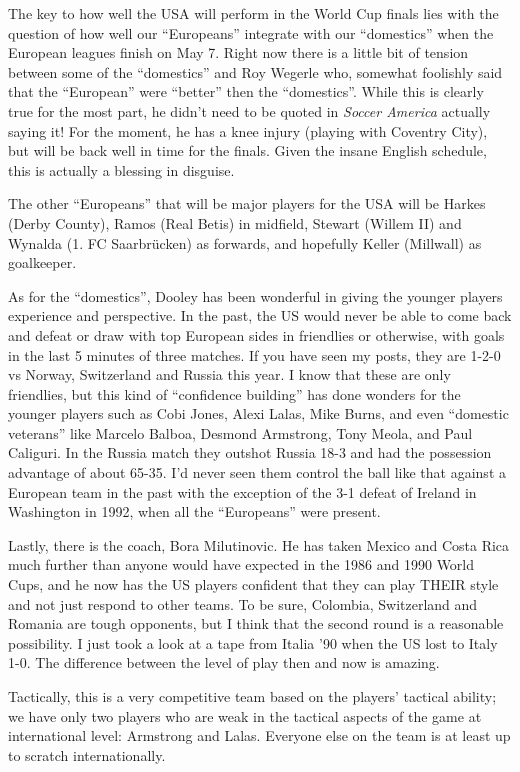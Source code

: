 The key to how well the USA will perform in the World Cup finals lies with the
question of how well our ``Europeans'' integrate with our ``domestics'' when the 
European leagues finish on May 7. Right now there is a little bit of tension 
between some of the ``domestics'' and Roy Wegerle who, somewhat foolishly said 
that the ``European'' were ``better'' then the ``domestics''. While this is clearly
true for the most part, he didn't need to be quoted in \textit{Soccer America} 
actually saying it! For the moment, he has a knee injury (playing with Coventry
City), but will be back well in time for the finals. Given the insane English
schedule, this is actually a blessing in disguise.

The other ``Europeans'' that will be major players for the USA will be Harkes 
(Derby County), Ramos (Real Betis) in midfield, Stewart (Willem II) and Wynalda
(1. FC Saarbr{\"u}cken) as forwards, and hopefully Keller (Millwall) as 
goalkeeper.

As for the ``domestics'', Dooley has been wonderful in giving the younger players
experience and perspective. In the past, the US would never be able to come 
back and defeat or draw with top European sides in friendlies or otherwise,
with goals in the last 5 minutes of three matches. If you have seen my posts, 
they are 1-2-0 vs Norway, Switzerland and Russia this year. I know that these 
are only friendlies, but this kind of ``confidence building'' has done wonders
for the younger players such as Cobi Jones, Alexi Lalas, Mike Burns, and even 
``domestic veterans'' like Marcelo Balboa, Desmond Armstrong, Tony Meola, and 
Paul Caliguri. In the Russia match they outshot Russia 18-3 and had the 
possession advantage of about 65-35. I'd never seen  them control the ball 
like that against a European team in the past with the exception of the 3-1 
defeat of Ireland in Washington in 1992, when all the ``Europeans'' were present.

Lastly, there is the coach, Bora Milutinovic. He has taken Mexico and Costa 
Rica much further than anyone would have expected in the 1986 and 1990 World 
Cups, and he now has the US players confident that they can play THEIR style 
and not just respond to other teams. To be sure, Colombia, Switzerland and 
Romania are tough opponents, but I think that the second round is a reasonable
possibility. I just took a look at a tape from Italia '90 when the US lost to 
Italy 1-0. The difference between the level of play then and now is amazing.

Tactically, this is a very competitive team based on the players' tactical
ability; we have only two players who are weak in the tactical aspects of the 
game at international level: Armstrong and Lalas. Everyone else on the team is 
at least up to scratch internationally.

